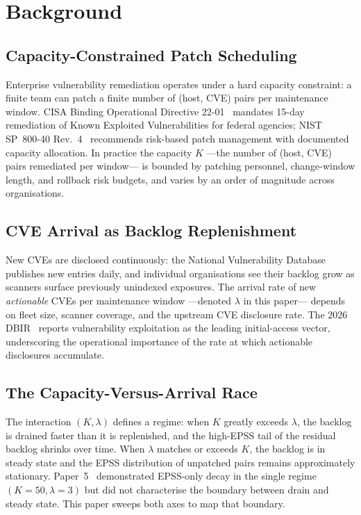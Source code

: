 \section{Background}

\subsection{Capacity-Constrained Patch Scheduling}

Enterprise vulnerability remediation operates under a hard capacity
constraint: a finite team can patch a finite number of (host, CVE) pairs
per maintenance window. CISA Binding Operational Directive 22-01~\cite{cisa2021bod2201}
mandates 15-day remediation of Known Exploited Vulnerabilities for federal
agencies; NIST SP~800-40 Rev.~4~\cite{nist2022sp80040r4} recommends risk-based
patch management with documented capacity allocation. In practice the
capacity $K$ ---the number of (host, CVE) pairs remediated per window---
is bounded by patching personnel, change-window length, and rollback risk
budgets, and varies by an order of magnitude across organisations.

\subsection{CVE Arrival as Backlog Replenishment}

New CVEs are disclosed continuously: the National Vulnerability Database
publishes new entries daily, and individual organisations see their backlog
grow as scanners surface previously unindexed exposures. The arrival rate
of new \textit{actionable} CVEs per maintenance window ---denoted $\lambda$
in this paper--- depends on fleet size, scanner coverage, and the upstream
CVE disclosure rate. The 2026 DBIR~\cite{verizon2026dbir} reports vulnerability
exploitation as the leading initial-access vector, underscoring the
operational importance of the rate at which actionable disclosures
accumulate.

\subsection{The Capacity-Versus-Arrival Race}

The interaction $(K, \lambda)$ defines a regime: when $K$ greatly exceeds
$\lambda$, the backlog is drained faster than it is replenished, and the
high-EPSS tail of the residual backlog shrinks over time. When $\lambda$
matches or exceeds $K$, the backlog is in steady state and the EPSS
distribution of unpatched pairs remains approximately stationary. Paper~5~\cite{paper5temporal}
demonstrated EPSS-only decay in the single regime $(K=50, \lambda=3)$ but
did not characterise the boundary between drain and steady state. This
paper sweeps both axes to map that boundary.

